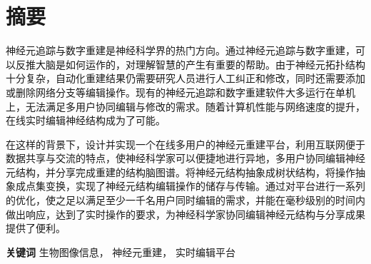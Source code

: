 \chapter{摘要}

神经元追踪与数字重建是神经科学界的热门方向。通过神经元追踪与数字重建，可以反推大脑是如何运作的，对理解智慧的产生有重要的帮助。由于神经元拓扑结构十分复杂，自动化重建结果仍需要研究人员进行人工纠正和修改，同时还需要添加或删除网络分支等编辑操作。现有的神经元追踪和数字重建软件大多运行在单机上，无法满足多用户协同编辑与修改的需求。随着计算机性能与网络速度的提升，在线实时编辑神经结构成为了可能。

在这样的背景下，设计并实现一个在线多用户的神经元重建平台，利用互联网便于数据共享与交流的特点，使神经科学家可以便捷地进行异地，多用户协同编辑神经元结构，并分享完成重建的结构脑图谱。将神经元结构抽象成树状结构，将操作抽象成点集变换，实现了神经元结构编辑操作的储存与传输。通过对平台进行一系列的优化，使之足以满足至少一千名用户同时编辑的需求，并能在毫秒级别的时间内做出响应，达到了实时操作的要求，为神经科学家协同编辑神经元结构与分享成果提供了便利。

{
    \vspace{1em}
    \setlength{\parindent}{0em}
    \textbf{关键词} \; 生物图像信息， \; 神经元重建， \; 实时编辑平台 \par
}
